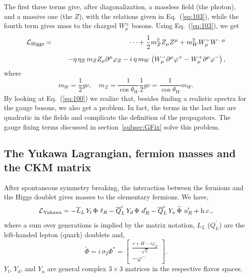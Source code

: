 \documentclass{ws-ijmpa}
\begin{document}
%
The first three terms give, after diagonalization, a massless field
(the photon), and a massive one (the $Z$), with the relations given in
Eq.~(\ref{eq:103}), while the fourth term gives mass to the charged
$W^\pm_\mu$ bosons.
Using Eq.~(\ref{eq:103}), we get
%
\begin{eqnarray}
\mathcal{L}_{\rm Higgs}
&=&
\cdots + 
\frac{1}{2} m_Z^2 Z_\mu Z^\mu + m_W^2 W_\mu^+  W^{-\mu} 
\nonumber\\[+2mm]
& &
\hspace{5mm}
- \eta\,\eta_Z\, m_Z Z_\mu \partial^\mu \varphi_Z 
- i\, \eta\, m_W \left( W_\mu^- \partial^\mu \varphi^+ -
W_\mu^+ \partial^\mu \varphi^-\right),
\label{eq:100}
\end{eqnarray}
%
where
%
\begin{equation}
  \label{eq:101}
  m_W = \frac{1}{2} g v, \quad
m_Z = \frac{1}{\cos\theta_W} \frac{1}{2} g v =
\frac{1}{\cos\theta_W} m_W.
\end{equation}
%
By looking at Eq.~(\ref{eq:100}) we realize that,
besides finding a realistic spectra for the gauge bosons,
we also get a problem.
In fact,
the terms in the last line are quadratic in the fields and complicate
the definition of the propagators.
The gauge fixing terms discussed in section~\ref{subsec:GFix}
solve this problem.


\subsection{The Yukawa Lagrangian, fermion masses and the CKM matrix}

After spontaneous symmetry breaking,
the interaction between the fermions and the Higgs doublet
gives masses to the elementary fermions.
We have,
%
\begin{equation}
\label{eq:116}
\mathcal{L}_{\rm Yukawa}=
- \overline{L}_L\,  Y_l\, \Phi\ \ell_R
- \overline{Q}^\prime_L\,  Y_d\,  \Phi\ d^\prime_R
- \overline{Q}^\prime_L\,  Y_u\,  \widetilde{\Phi}\ u^\prime_R +
\textrm{h.c.} ,
\end{equation}
%
where a sum over generations is implied by the matrix notation,
$L_L$ ($Q^\prime_L$) are the left-handed lepton (quark) doublets and,
%
\begin{equation}
  \label{eq:118}
  \widetilde{\Phi} = i\, \sigma_2 \Phi^* = \left[
    \begin{matrix}
\displaystyle
      \frac{v + H - i \varphi_Z}{\sqrt{2}}\\[+2mm]
      -\varphi^-
    \end{matrix}
\right].
\end{equation}
%
$Y_l$, $Y_d$, and $Y_u$ are general complex $3 \times 3$ matrices in
the respective flavor spaces.
\end{document}
